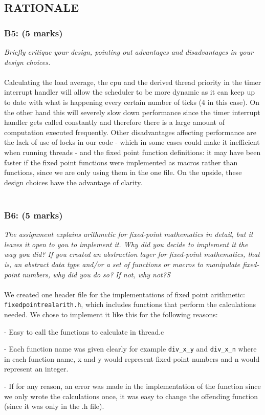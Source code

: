 \documentclass{article}
\begin{document}
\subsection{RATIONALE}

\subsubsection*{B5: (5 marks) }
\textit{Briefly critique your design, pointing out advantages and disadvantages in your design choices.}
\\ \\
 Calculating the load average, the cpu and the derived thread priority in the
  timer interrupt handler will allow the scheduler to be more dynamic as it can
  keep up to date with what is happening every certain number of ticks (4 in this case).
  On the other hand this will severely slow down performance since the timer interrupt
  handler gets called constantly and therefore there is a large amount of computation
  executed frequently.
Other disadvantages affecting performance are the lack of use of locks in our code - which in some cases could make it inefficient when running threads - and the fixed point function definitions: it may have been faster if the fixed point functions were implemented as macros rather than functions, since we are only using them in the one file. On the upside, these design choices have the advantage of clarity.
\\ \\

\subsubsection*{B6: (5 marks) }
\textit{The assignment explains arithmetic for fixed-point mathematics in detail, but it leaves it open to you to implement it.  Why did you decide to implement it the way you did?  If you created an abstraction layer for fixed-point mathematics, that is, an abstract data type and/or a set of functions or macros to manipulate fixed-point numbers, why did you do so?  If not, why not?S}
\\ \\
We created one header file for the implementations of fixed point arithmetic: \texttt{fixedpointrealarith.h}, which includes functions that perform the calculations needed.
We chose to implement it like this for the following reasons:

    - Easy to call the functions to calculate in thread.c
    
	- Each function name was given clearly for example \texttt{div\_x\_y} and \texttt{div\_x\_n}
	  where in each function name, x and y would represent fixed-point numbers
	  and n would represent an integer.
      
	- If for any reason, an error was made in the implementation of the function
      since we only wrote the calculations once, it was easy to change the offending
      function (since it was only in the .h file).
\end{document}
